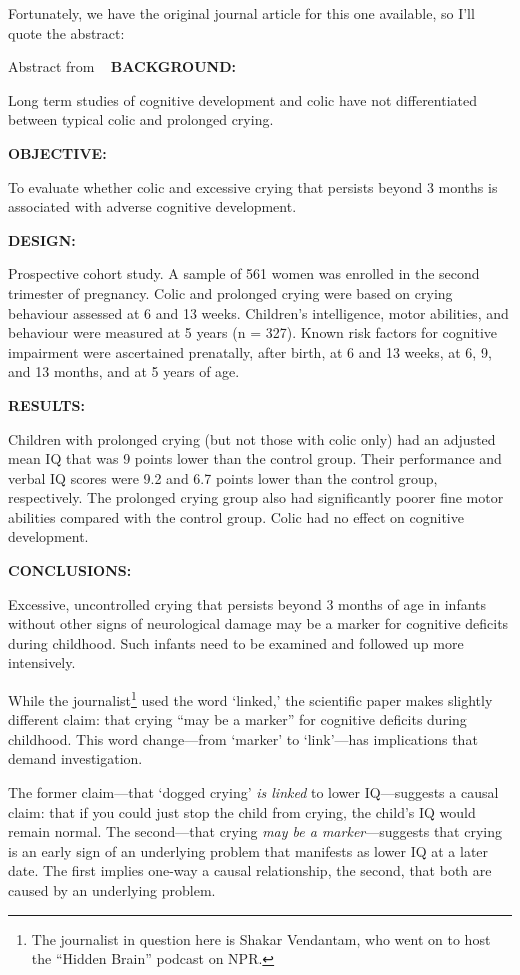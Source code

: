 \begin{refsection}
Fortunately, we have the original journal article for this one available, so I'll quote the abstract:
\begin{apatextbox}{Abstract from  ~\citep{Rao:2004ku} }
\textbf{BACKGROUND:}

Long term studies of cognitive development and colic have not differentiated between typical colic and prolonged crying.

\textbf{OBJECTIVE:}

To evaluate whether colic and excessive crying that persists beyond 3 months is associated with adverse cognitive development.

\textbf{DESIGN:}

Prospective cohort study. A sample of 561 women was enrolled in the second trimester of pregnancy. Colic and prolonged crying were based on crying behaviour assessed at 6 and 13 weeks. Children's intelligence, motor abilities, and behaviour were measured at 5 years (n = 327). Known risk factors for cognitive impairment were ascertained prenatally, after birth, at 6 and 13 weeks, at 6, 9, and 13 months, and at 5 years of age.

\textbf{RESULTS:}

Children with prolonged crying (but not those with colic only) had an adjusted mean IQ that was 9 points lower than the control group. Their performance and verbal IQ scores were 9.2 and 6.7 points lower than the control group, respectively. The prolonged crying group also had significantly poorer fine motor abilities compared with the control group. Colic had no effect on cognitive development.

\textbf{CONCLUSIONS:}

Excessive, uncontrolled crying that persists beyond 3 months of age in infants without other signs of neurological damage may be a marker for cognitive deficits during childhood. Such infants need to be examined and followed up more intensively.
\end{apatextbox}

While the journalist\footnote{The journalist in question here is Shakar Vendantam, who went on to host the ``Hidden Brain'' podcast on NPR.} used the word `linked,' the scientific paper makes slightly different claim: that crying ``may be a marker'' for cognitive deficits during childhood. This word change---from `marker' to `link'---has implications that demand investigation.

The former claim---that `dogged crying' \emph{is linked} to lower IQ---suggests a causal claim: that if you could just stop the child from crying, the child's IQ would remain normal. The second---that crying \emph{may be a marker}---suggests that crying is an early sign of an underlying problem that manifests as lower IQ at a later date. The first implies one-way a causal relationship, the second, that both are caused by an underlying problem.


\end{refsection}
